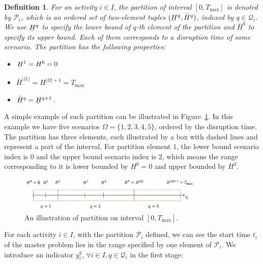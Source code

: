 \documentclass[11pt]{article}
\newtheorem{definition}{Definition}
\newcommand{\noi}{\noindent}
\renewcommand{\underbar}{\underaccent{\bar}}
\begin{document}
	\begin{definition}
		For an activity \(i \in I\), the partition of interval \([0,T_{\max}]\) is denoted by \(\mathcal{P}_i\), which is an ordered set of two-element tuples %
		\((\underbar{H}^q,\bar{H}^q)\), 
		indexed by \(q \in \mathcal{Q}_i\). We use \(\underbar{H}^q\) to specify the lower bound of \(q\)-th element of the partition and \(\bar{H}^q\) to specify its upper bound. Each of them corresponds to a disruption time of some scenario.
		The partition has the following properties:
		\begin{itemize}
			\item \(\underbar{H}^1 = H^0 = 0\)
			\item \(\bar{H}^{|\mathcal{Q}_i|} = H^{|\Omega| + 1} = T_{\max}\)
			\item \(\bar{H}^q = \underbar{H}^{q + 1}\).
		\end{itemize}
	\end{definition}
	\noi A simple example of such partition can be illustrated in Figure~\ref{fig:simplePart}. In this example we have five scenarios \(\Omega = \{1,2,3,4,5\}\), ordered by the disruption time. The partition has three elements, each illustrated by a box with dashed lines and represent a part of the interval. For partition element \(1\), the lower bound scenario index is \(0\) and the upper bound scenario index is \(2\), which means the range corresponding to it is lower bounded by \(H^0 = 0\) and upper bounded by \(H^2\).
	\begin{figure}[H]
		\centering
		\includegraphics[width=0.8\textwidth]{simplePart}
		\caption{An illustration of partition on interval \([0,T_{\max}]\).}
		\label{fig:simplePart}
	\end{figure}
	\noi For each activity \(i \in I\), with the partition \(\mathcal{P}_i\) defined, we can see the start time \(t_i\) of the master problem lies in the range specified by one element of \(\mathcal{P}_i\). We introduce an indicator \(y_i^q\), \(\forall i \in I, q \in \mathcal{Q}_i\) in the first stage:
\end{document}
